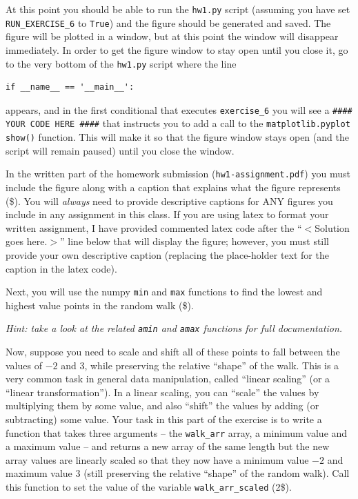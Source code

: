 \documentclass[10pt]{article}
\begin{document}
\begin{enumerate}
At this point you should be able to run the {\tt hw1.py} script (assuming you have set {\tt RUN\_EXERCISE\_6} to {\tt True}) and the figure should be generated and saved. The figure will be plotted in a window, but at this point the window will disappear immediately. In order to get the figure window to stay open until you close it, go to the very bottom of the {\tt hw1.py} script where the line
\begin{verbatim}
if __name__ == '__main__':
\end{verbatim}
appears, and in the first conditional that executes {\tt exercise\_6} you will see a {\tt \#\#\#\# YOUR CODE HERE \#\#\#\#} that instructs you to add a call to the {\tt matplotlib.pyplot} {\tt show()} function. This will make it so that the figure window stays open (and the script will remain paused) until you close the window.

In the written part of the homework submission ({\tt hw1-assignment.pdf}) you must include the figure along with a caption that explains what the figure represents (\$). You will {\em always} need to provide descriptive captions for ANY figures you include in any assignment in this class. If you are using latex to format your written assignment, I have provided commented latex code after the ``$<$Solution goes here.$>$'' line below that will display the figure; however, you must still provide your own descriptive caption (replacing the place-holder text for the caption in the latex code).

Next, you will use the numpy {\tt min} and {\tt max} functions to find the lowest and highest value points in the random walk (\$).

{\em Hint: take a look at the related {\tt amin} and {\tt amax} functions for full documentation.}

Now, suppose you need to scale and shift all of these points to fall between the values of $-2$ and $3$, while preserving the relative ``shape'' of the walk. This is a very common task in general data manipulation, called ``linear scaling'' (or a ``linear transformation''). In a linear scaling, you can ``scale'' the values by multiplying them by some value, and also ``shift'' the values by adding (or subtracting) some value. Your task in this part of the exercise is to write a function that takes three arguments -- the {\tt walk\_arr} array, a minimum value and a maximum value -- and returns a new array of the same length but the new array values are linearly scaled so that they now have a minimum value $-2$ and maximum value $3$ (still preserving the relative ``shape'' of the random walk). Call this function to set the value of the variable {\tt walk\_arr\_scaled} (2\$).


\end{enumerate}
\end{document}
